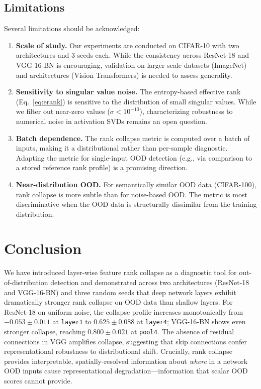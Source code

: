 \documentclass{article}
\begin{document}
\subsection{Limitations}

Several limitations should be acknowledged:

\begin{enumerate}
    \item \textbf{Scale of study.} Our experiments are conducted on CIFAR-10 with two architectures and 3 seeds each. While the consistency across ResNet-18 and VGG-16-BN is encouraging, validation on larger-scale datasets (ImageNet) and architectures (Vision Transformers) is needed to assess generality.
    \item \textbf{Sensitivity to singular value noise.} The entropy-based effective rank (Eq.~\ref{eq:erank}) is sensitive to the distribution of small singular values. While we filter out near-zero values ($\sigma < 10^{-10}$), characterizing robustness to numerical noise in activation SVDs remains an open question.
    \item \textbf{Batch dependence.} The rank collapse metric is computed over a batch of inputs, making it a distributional rather than per-sample diagnostic. Adapting the metric for single-input OOD detection (e.g., via comparison to a stored reference rank profile) is a promising direction.
    \item \textbf{Near-distribution OOD.} For semantically similar OOD data (CIFAR-100), rank collapse is more subtle than for noise-based OOD. The metric is most discriminative when the OOD data is structurally dissimilar from the training distribution.
\end{enumerate}

\section{Conclusion}
\label{sec:conclusion}

We have introduced layer-wise feature rank collapse as a diagnostic tool for out-of-distribution detection and demonstrated across two architectures (ResNet-18 and VGG-16-BN) and three random seeds that deep network layers exhibit dramatically stronger rank collapse on OOD data than shallow layers. For ResNet-18 on uniform noise, the collapse profile increases monotonically from $-0.053 \pm 0.011$ at \texttt{layer1} to $0.625 \pm 0.088$ at \texttt{layer4}; VGG-16-BN shows even stronger collapse, reaching $0.800 \pm 0.021$ at \texttt{pool4}. The absence of residual connections in VGG amplifies collapse, suggesting that skip connections confer representational robustness to distributional shift. Crucially, rank collapse provides interpretable, spatially-resolved information about \emph{where} in a network OOD inputs cause representational degradation---information that scalar OOD scores cannot provide.
\end{document}

